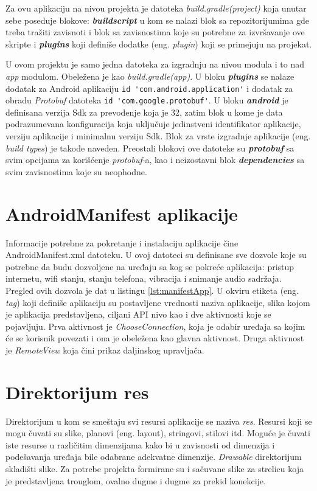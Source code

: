 \documentclass[implementacija.tex]{subfiles}
\begin{document}
Za ovu aplikaciju na nivou projekta je datoteka \textit{build.gradle(project)} koja unutar sebe poseduje blokove: \textbf{\textit{buildscript}} u kom se nalazi blok sa repozitorijumima gde treba tražiti zavisnoti i blok sa zavisnostima koje su potrebne za izvršavanje ove skripte i \textbf{\textit{plugins}} koji definiše dodatke (eng. \textit{plugin}) koji se primejuju na projekat.

U ovom projektu je samo jedna datoteka za izgradnju na nivou modula i to nad \textit{app} modulom. Obeležena je kao \textit{build.gradle(app)}. U bloku \textit{\textbf{plugins}} se nalaze dodatak za Android aplikaciju  \verb|id 'com.android.application'| i dodatak za obradu \textit{Protobuf} datoteka \verb|id 'com.google.protobuf'|. U bloku \textit{\textbf{android}} je definisana verzija Sdk za prevođenje koja je 32, zatim blok u kome je data podrazumevana konfiguracija koja uključuje jedinstveni identifikator aplikacije, verziju aplikacije i minimalnu verziju Sdk. Blok za vrste izgradnje aplikacije (eng. \textit{build types}) je takođe naveden. Preostali blokovi ove datoteke su \textit{\textbf{protobuf}} sa svim opcijama za korišćenje \textit{protobuf}-a, kao i neizostavni blok \textit{\textbf{dependencies}} sa svim zavisnostima koje su neophodne. 

\section{AndroidManifest aplikacije}

Informacije potrebne za pokretanje i instalaciju aplikacije čine AndroidManifest.xml datoteku. U ovoj datoteci su definisane sve dozvole koje su potrebne da budu dozvoljene na uređaju sa kog se pokreće aplikacija: pristup internetu, wifi stanju, stanju telefona, vibracija i  snimanje audio sadržaja. Pregled ovih dozvola je dat u listingu \ref{lst:manifestApp}. U okviru etiketa (eng. \textit{tag}) koji definiše aplikaciju su postavljene vrednosti naziva aplikacije, slika kojom je aplikacija predstavljena, ciljani API nivo kao i dve aktivnosti koje se pojavljuju. Prva aktivnost je \textit{ChooseConnection}, koja je odabir uređaja sa kojim će se korisnik povezati i ona je obeležena kao glavna aktivnost. Druga aktivnost je \textit{RemoteView} koja čini prikaz daljinskog upravljača. 




\section{Direktorijum res}
Direktorijum u kom se smeštaju svi resursi aplikacije se naziva \textit{res}. Resursi koji se mogu čuvati su slike, planovi (eng. layout), stringovi, stilovi itd. Moguće je čuvati iste resurse u različitim dimenzijama kako bi u zavisnosti od dimenzija i podešavanja uređaja bile odabrane adekvatne dimenzije. \textit{Drawable} direktorijum skladišti slike. Za potrebe projekta formirane su i sačuvane slike za strelicu koja je predstavljena trouglom, ovalno dugme i dugme za prekid konekcije. 
\end{document}
